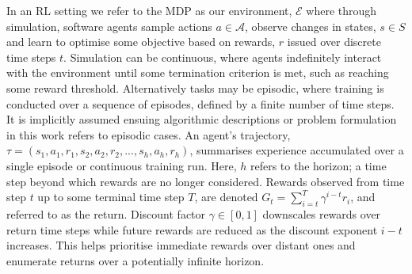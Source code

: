 \documentclass[conference,compsoc]{IEEEtran}
\begin{document}
In an RL setting we refer to the MDP as our environment, $\mathcal{E}$ where through simulation, software agents sample actions $a \in \mathcal{A}$, observe changes in states, $s \in S$ and learn to optimise some objective based on rewards, $r$ issued over discrete time steps $t$. Simulation can be continuous, where agents indefinitely interact with the environment until some termination criterion is met, such as reaching some reward threshold. Alternatively tasks may be episodic, where training is conducted over a sequence of episodes, defined by a finite number of time steps. It is implicitly assumed ensuing algorithmic descriptions or problem formulation in this work refers to episodic cases. An agent's trajectory, $\tau = (s_1, a_1, r_1,  s_2, a_2, r_2,...,s_h, a_h, r_h)$, summarises experience accumulated over a single episode or continuous training run. Here, $h$ refers to the horizon; a time step beyond which rewards are no longer considered. Rewards observed from time step $t$ up to some terminal time step $T$, are denoted $G_{t} = \sum_{i=t}^{T}\gamma^{i-t}r_{i}$, and referred to as the return. Discount factor $\gamma \in [0,1]$ downscales rewards over return time steps while future rewards are reduced as the discount exponent $i-t$ increases. This helps prioritise immediate rewards over distant ones and enumerate returns over a potentially infinite horizon. 
\end{document}
